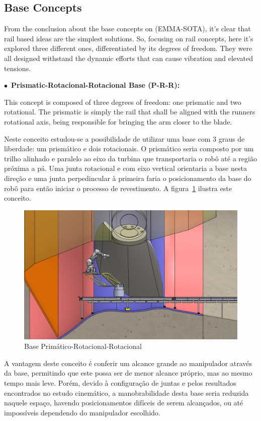 \subsection{Base Concepts}

From the conclusion about the base concepts on (EMMA-SOTA), it's clear that rail
based ideas are the simplest solutions. So, focusing on rail concepts, here it's
explored three different ones, differentiated by its degrees of freedom. They
were all designed withstand the dynamic efforts that can cause vibration and
elevated tensions.


$\bullet$~\textbf{Prismatic-Rotacional-Rotacional Base (P-R-R):}
  
  This concept is composed of three degrees of freedom: one prismatic and two
  rotational. The prismatic is simply the rail that shall be aligned with the
  runners rotational axis, being responsible for bringing the arm closer to the
  blade. 
  
  Neste conceito estudou-se a possibilidade de utilizar uma base com $3$ graus
  de liberdade: um prismático e dois rotacionais. O prismático seria composto
  por um trilho alinhado e paralelo ao eixo da turbina que transportaria o robô
  até a região próxima a pá. Uma junta rotacional e com eixo vertical orientaria
  a base nesta direção e uma junta perpedincular à primeira faria o
  posicionamento da base do robô para então iniciar o processo de revestimento.
  A figura~\ref{fig::base_prr} ilustra este conceito.
    
  \begin{figure}[h!]
   \centering
   \includegraphics[width=0.8\columnwidth]{figs/bases/base_prr}
   \caption{Base Primático-Rotacional-Rotacional}
   \label{fig::base_prr}
\end{figure}

  A vantagem deste conceito é conferir um alcance grande ao manipulador através
  da base, permitindo que este possa ser de menor alcance próprio, mas ao mesmo
  tempo mais leve.
  Porém, devido à configuração de juntas e pelos resultados encontrados no
  estudo cinemático, a manobrabilidade desta base seria reduzida naquele espaço,
  havendo posicionamentos difíceis de serem alcançados, ou até impossíveis
  dependendo do manipulador escolhido.
  
